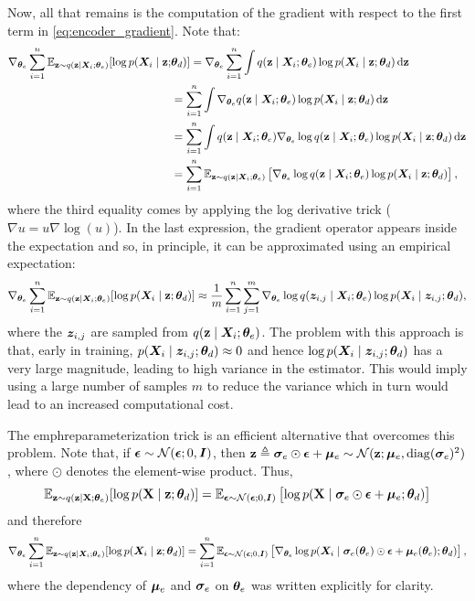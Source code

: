 Now, all that remains is the computation of the gradient with respect to the first term in \eqref{eq:encoder_gradient}. Note that:
\begingroup
\allowdisplaybreaks
\begin{align}
    \nabla_{{\bm{\theta}}_e} \sum_{i=1}^n \mathbb{E}_{{\mathbf{z}} \sim q({\mathbf{z}} \mid {\bm{X}}_i; {\bm{\theta}}_e)} [\log p({\bm{X}}_i \mid {\mathbf{z}}; &{\bm{\theta}}_d) ] = \nabla_{{\bm{\theta}}_e} \sum_{i=1}^n \int q({\mathbf{z}} \mid {\bm{X}}_i; {\bm{\theta}}_e) \log p({\bm{X}}_i \mid {\mathbf{z}}; {\bm{\theta}}_d) {\,\text{d}} {\mathbf{z}} \nonumber\\
    &= \sum_{i=1}^n \int \nabla_{{\bm{\theta}}_e} q({\mathbf{z}} \mid {\bm{X}}_i; {\bm{\theta}}_e) \log p({\bm{X}}_i \mid {\mathbf{z}}; {\bm{\theta}}_d) {\,\text{d}} {\mathbf{z}} \nonumber\\
    &= \sum_{i=1}^n \int q({\mathbf{z}} \mid {\bm{X}}_i; {\bm{\theta}}_e) \nabla_{{\bm{\theta}}_e} \log q({\mathbf{z}} \mid {\bm{X}}_i; {\bm{\theta}}_e) \log p({\bm{X}}_i \mid {\mathbf{z}}; {\bm{\theta}}_d) {\,\text{d}} {\mathbf{z}} \nonumber\\
    &= \sum_{i=1}^n \mathbb{E}_{{\mathbf{z}} \sim q({\mathbf{z}} \mid {\bm{X}}_i; {\bm{\theta}}_e)} \left[\nabla_{{\bm{\theta}}_e} \log q({\mathbf{z}} \mid {\bm{X}}_i; {\bm{\theta}}_e) \log p({\bm{X}}_i \mid {\mathbf{z}}; {\bm{\theta}}_d)\right],
\end{align}
\endgroup
where the third equality comes by applying the log derivative trick ($\nabla u = u \nabla \log(u)$). In the last expression, the gradient operator appears inside the expectation and so, in principle, it can be approximated using an empirical expectation:
\begin{equation}
    \nabla_{{\bm{\theta}}_e} \sum_{i=1}^n \mathbb{E}_{{\mathbf{z}} \sim q({\mathbf{z}} \mid {\bm{X}}_i; {\bm{\theta}}_e)} [\log p({\bm{X}}_i \mid {\mathbf{z}}; {\bm{\theta}}_d) ] \approx \frac{1}{m} \sum_{i=1}^n \sum_{j=1}^m \nabla_{{\bm{\theta}}_e} \log q({\bm{z}}_{i,j} \mid {\bm{X}}_i; {\bm{\theta}}_e) \log p({\bm{X}}_i \mid {\bm{z}}_{i,j}; {\bm{\theta}}_d),
\end{equation}
where the ${\bm{z}}_{i,j}$ are sampled from $q({\mathbf{z}} \mid {\bm{X}}_i; {\bm{\theta}}_e)$. The problem with this approach is that, early in training, $p({\bm{X}}_i \mid {\bm{z}}_{i,j}; {\bm{\theta}}_d) \approx 0$ and hence $\log p({\bm{X}}_i \mid {\bm{z}}_{i,j}; {\bm{\theta}}_d)$ has a very large magnitude, leading to high variance in the estimator. This would imply using a large number of samples $m$ to reduce the variance which in turn would lead to an increased computational cost.

The emph{reparameterization trick} is an efficient alternative that overcomes this problem. Note that, if ${\bm{\epsilon}} \sim \mathcal{N}({\bm{\epsilon}}; 0, {\bm{I}})$, then ${\mathbf{z}} \triangleq {\bm{\sigma}}_e \odot {\bm{\epsilon}} + {\bm{\mu}}_e \sim  \mathcal{N}({\mathbf{z}}; {\bm{\mu}}_e, \mathrm{diag}({\bm{\sigma}}_e)^2)$, where $\odot$ denotes the element-wise product. Thus,
\begin{equation}
    \mathbb{E}_{{\mathbf{z}} \sim q({\mathbf{z}} \mid {\mathbf{X}}; {\bm{\theta}}_e)} [\log p({\mathbf{X}} \mid {\mathbf{z}}; {\bm{\theta}}_d)] = \mathbb{E}_{{\bm{\epsilon}} \sim \mathcal{N}({\bm{\epsilon}}; 0, {\bm{I}})} \left[\log p({\mathbf{X}} \mid {\bm{\sigma}}_e \odot {\bm{\epsilon}} + {\bm{\mu}}_e; {\bm{\theta}}_d) \right]
\end{equation}
and therefore
\begin{equation}
    \nabla_{{\bm{\theta}}_e} \sum_{i=1}^n \mathbb{E}_{{\mathbf{z}} \sim q({\mathbf{z}} \mid {\bm{X}}_i; {\bm{\theta}}_e)} [\log p({\bm{X}}_i \mid {\mathbf{z}}; {\bm{\theta}}_d) ] = \sum_{i=1}^n \mathbb{E}_{{\bm{\epsilon}} \sim \mathcal{N}({\bm{\epsilon}}; 0, {\bm{I}})} \left[\nabla_{{\bm{\theta}}_e} \log p({\bm{X}}_i \mid {\bm{\sigma}}_e({\bm{\theta}}_e) \odot {\bm{\epsilon}} + {\bm{\mu}}_e({\bm{\theta}}_e); {\bm{\theta}}_d)\right],
\end{equation}
where the dependency of ${\bm{\mu}}_e$ and ${\bm{\sigma}}_e$ on ${\bm{\theta}}_e$ was written explicitly for clarity.